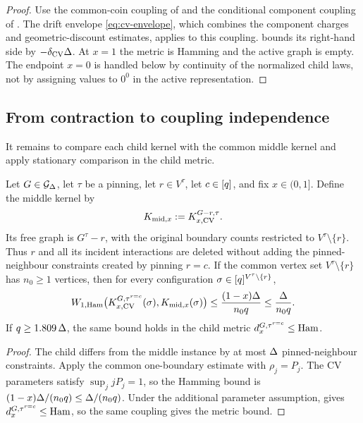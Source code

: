 \begin{proof}
Use the common-coin coupling of
 and the conditional component
coupling of .
The drift envelope \eqref{eq:cv-envelope}, which combines the component
charges and geometric-discount estimates, applies to this coupling.
 bounds its right-hand side by
$-\delta_{\rm CV}\Delta$.  At $x=1$ the metric is Hamming and the active
graph is empty.  The endpoint $x=0$ is handled below by continuity of the
normalized child laws, not by assigning values to $0^0$ in the active
representation.
\end{proof}

\subsection{From contraction to coupling independence}

It remains to compare each child kernel with the common middle kernel and
apply stationary comparison in the child metric.

\begin{lemma}
\label{lem:cv-child-middle}
Let \(G\in\mathcal{G}_{\Delta}\), let \(\tau\) be a pinning, let \(r\in V^\tau\),
let \(c\in[q]\), and fix \(x\in(0,1]\). Define the middle kernel by
\[
  K_{{\rm mid},x}:=K_{x,\mathrm{CV}}^{G-r,\tau}.
\]
Its free graph is \(G^\tau-r\), with the original boundary counts restricted
to \(V^\tau\setminus\{r\}\). Thus \(r\) and all its incident interactions
are deleted without adding the pinned-neighbour constraints created by
pinning \(r=c\). If the common vertex set
\(V^\tau\setminus\{r\}\) has \(n_0\ge1\) vertices, then for every configuration
\(\sigma\in[q]^{V^\tau\setminus\{r\}}\),
\[
  W_{1,\operatorname{Ham}}\bigl(K_{x,\mathrm{CV}}^{G,\tau^{r=c}}(\sigma),
             K_{{\rm mid},x}(\sigma)\bigr)
       \le\frac{(1-x)\Delta}{n_0q}
       \le\frac{\Delta}{n_0q}.
\]
If $q\ge1.809\,\Delta$, the same bound holds in the child metric
$d_x^{G,\tau^{r=c}}\le\operatorname{Ham}$.
\end{lemma}

\begin{proof}
The child differs from the middle instance by at most \(\Delta\) pinned-neighbour
constraints.  Apply the common one-boundary estimate
 with \(\rho_j=P_j\).  The CV parameters
satisfy \(\sup_j jP_j=1\), so the Hamming bound is
\((1-x)\Delta/(n_0q)\le\Delta/(n_0q)\).  Under the additional parameter
assumption,  gives
\(d_x^{G,\tau^{r=c}}\le\operatorname{Ham}\), so the same coupling gives the
metric bound.
\end{proof}

